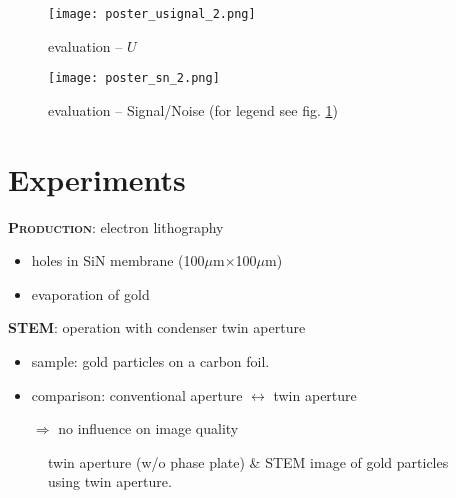 \documentclass[portrait]{sciposter}
\begin{document}
\begin{multicols}{3}
\begin{figure}[hbt]
\label{fig_sql_1}
\texttt{[image: poster\_usignal\_2.png]}
\caption{evaluation -- $U$}
\end{figure}

\begin{figure}[hbt]
\texttt{[image: poster\_sn\_2.png]}
\caption{evaluation -- Signal/Noise (for legend see fig. \ref{fig_sql_1})}
\label{fig_sql_2}
\end{figure}



\section{Experiments}
\textbf{\scshape Production}: electron lithography
\begin{itemize}
\item holes in SiN membrane (100$\mu$m$\times$100$\mu$m)
\item evaporation of gold
\end{itemize}

\textbf{\scshape STEM}: operation with condenser twin aperture
\begin{itemize}
\item sample: gold particles on a carbon foil.
\item comparison: conventional aperture $\leftrightarrow$ twin aperture
\item[$\Rightarrow$] no influence on image quality
\end{itemize}

\begin{figure}[hbt]
\label{fig_goldstem}
\caption{twin aperture (w/o phase plate) \& STEM image of gold particles using twin aperture.}
\end{figure}


\end{multicols}
\end{document}
